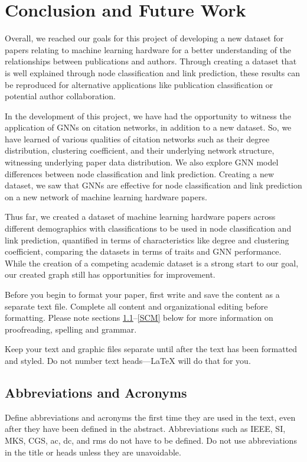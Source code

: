 \documentclass[conference]{IEEEtran}
\begin{document}
\section{Conclusion and Future Work}

Overall, we reached our goals for this project of developing a new dataset 
for papers relating to machine learning hardware for a better understanding 
of the relationships between publications and authors. Through creating a 
dataset that is well explained through node classification and link prediction, 
these results can be reproduced for alternative applications like publication 
classification or potential author collaboration. \par 

In the development of this project, we have had the opportunity to witness 
the application of GNNs on citation networks, in addition to a new dataset. 
So, we have learned of various qualities of citation networks such as their 
degree distribution, clustering coefficient, and their underlying network 
structure, witnessing underlying paper data distribution. We also explore 
GNN model differences between node classification and link prediction. 
Creating a new dataset, we saw that GNNs are effective for node classification 
and link prediction on a new network of machine learning hardware papers. \par

Thus far, we created a dataset of machine learning hardware papers across 
different demographics with classifications to be used in node classification 
and link prediction, quantified in terms of characteristics like degree and 
clustering coefficient, comparing the datasets in terms of traits and GNN performance. 
While the creation of a competing academic dataset is a strong start to our goal, 
our created graph still has opportunities for improvement. \par

Before you begin to format your paper, first write and save the content as a 
separate text file. Complete all content and organizational editing before 
formatting. Please note sections \ref{AA}--\ref{SCM} below for more information on 
proofreading, spelling and grammar.

Keep your text and graphic files separate until after the text has been 
formatted and styled. Do not number text heads---{\LaTeX} will do that 
for you.

\subsection{Abbreviations and Acronyms}\label{AA}
Define abbreviations and acronyms the first time they are used in the text, 
even after they have been defined in the abstract. Abbreviations such as 
IEEE, SI, MKS, CGS, ac, dc, and rms do not have to be defined. Do not use 
abbreviations in the title or heads unless they are unavoidable.
\end{document}
